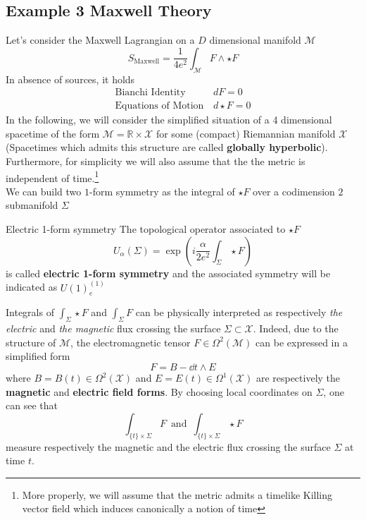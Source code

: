 \documentclass[11pt]{article}
\theoremstyle{definition}
\numberwithin{equation}{section}
\begin{document}
\subsection{Example 3 Maxwell Theory}
Let's consider the Maxwell Lagrangian on a $D$ dimensional manifold $\mathcal{M}$
\begin{equation}
    S_{\text{Maxwell}} = \frac{1}{4 e^2} \int_{\mathcal{M}} F \wedge \star F 
\end{equation}
In absence of sources, it holds
\begin{equation}
    \begin{aligned}
       \text{Bianchi Identity}&\, dF=0\\
        \text{Equations of Motion}&\, d \star F=0
    \end{aligned}
\end{equation}
In the following, we will consider the simplified situation of a 4 dimensional spacetime of the form $\mathcal{M}=\mathbb{R}\times \mathcal{X}$ for some (compact) Riemannian manifold $\mathcal{X}$ (Spacetimes which admits this structure are called \textbf{globally hyperbolic}). Furthermore, for simplicity we will also assume that the the metric is independent of time.\footnote{More properly, we will assume that the metric admits a timelike Killing vector field which induces canonically a notion of time}\\


We can build two $1$-form symmetry as the integral of $\star F$ over a codimension $2$ submanifold $\Sigma$
\begin{defn}{Electric 1-form symmetry}{}
The topological operator associated to $\star F$
    \begin{equation}
    U_{\alpha}(\Sigma) = \exp(i \frac{\alpha}{2e^2} \int_{\Sigma} \star F)
    \label{eq:TopEleMaxwell}
\end{equation}
is called \textbf{electric 1-form symmetry} and the associated symmetry will be indicated as $U(1)^{(1)}_e$
\end{defn}

Integrals of $\int_{\Sigma} \star F$ and $\int_{\Sigma} F$ can be physically interpreted as respectively \textit{the electric} and \textit{the magnetic} flux crossing the surface $\Sigma \subset \mathcal{X}$. Indeed, due to the structure of $\mathcal{M}$, the electromagnetic tensor $F \in \Omega^2(\mathcal{M})$ can be expressed in a simplified form
\begin{equation}
    F=B-\dd{t}\wedge E
\end{equation} 
where $B=B(t)\in\Omega^2(\mathcal{X})$ and $E=E(t)\in \Omega^1(\mathcal{X})$ are respectively the \textbf{magnetic} and \textbf{electric field forms}. By choosing local coordinates on $\Sigma$, one can see that
\begin{equation}
    \int_{{\{t\}\times\Sigma}} F \,\,\, \text{and} \,\,\, \int_{{\{t\}\times\Sigma}} \star F
\end{equation}
measure respectively the magnetic and the electric flux crossing the surface $\Sigma$ at time $t$.
\end{document}
